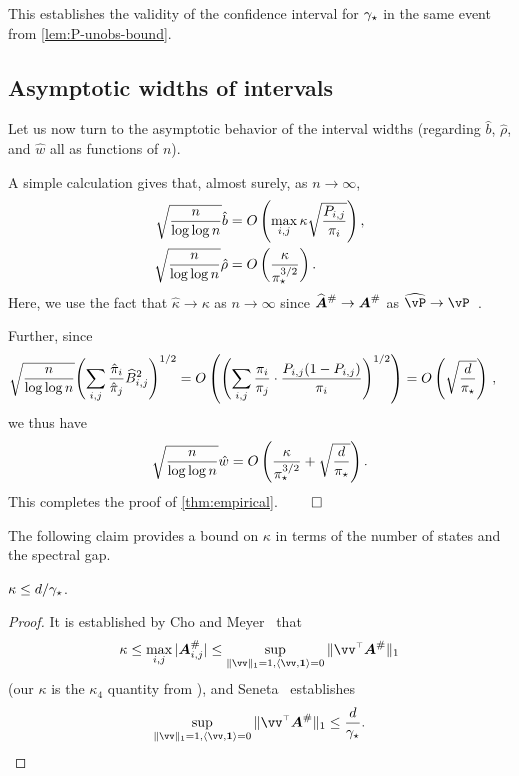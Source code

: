 This establishes the validity of the confidence interval for $\gamma_{\star}$ in
the same event from \cref{lem:P-unobs-bound}.

\subsection{Asymptotic widths of intervals}
\label{sec:asymptotic}

Let us now turn to the asymptotic behavior of the interval widths
(regarding $\hat{b}$, $\hat\rho$, and $\hat{w}$ all as
functions of $n$).

A simple calculation gives that, almost surely, as $n\to \infty$,
\begin{align*}
  \sqrt{\frac{n}{\log\log n}}
  \hat{b}
  & =
  O\left(
    \max_{i,j} \kappa \sqrt{\frac{P_{i,j}}{\pi_i}}
  \right)
  ,
  \\
  \sqrt{\frac{n}{\log\log n}}
  \hat\rho
  & =
  O\left(
    \frac{\kappa}{\pi_{\star}^{3/2}}
  \right)
  .
\end{align*}
Here, we use the fact that $\hat\kappa \to \kappa$ as $n\to\infty$
since $\giAh \to \giA$ as $\wh\vP \to
\vP$~\citep{li2001improvement,benitez2012continuity}.

Further, since
\begin{align*}
  \sqrt{\frac{n}{\log\log n}}
  \Biggl(
    \sum_{i,j} \frac{\hat{\pi}_i}{\hat{\pi}_j} \widehat{B}_{i,j}^2
  \Biggr)^{1/2}
  & =
  O\left(
    \Biggl(
      \sum_{i,j} \frac{{\pi}_i}{{\pi}_j}
      \cdot \frac{P_{i,j}(1-P_{i,j})}{\pi_i}
    \Biggr)^{1/2}
  \right)
  =
  O\left( \sqrt{ \frac{d}{\pi_{\star}}} \right)
  \,,
\end{align*}
we thus have
\begin{align*}
  \sqrt{\frac{n}{\log\log n}}
  \hat{w}
  =
  O\left(
    \frac{\kappa}{\pi_{\star}^{3/2}} +
    \sqrt{\frac{d}{\pi_{\star}}}
  \right)
  .
\end{align*}
This completes the proof of \cref{thm:empirical}.
\hfill $\qed$

The following claim provides a bound on $\kappa$ in terms of the
number of states and the spectral gap.
\begin{claim}
  \label{claim:kappa-bound}
  $\kappa \leq d/\gamma_{\star}$.
\end{claim}
\begin{proof}
  It is established by Cho and Meyer~\citep{cho2001comparison} that
  \[
    \kappa
    \leq \max_{i,j} |\giA_{i,j}|
    \leq
    \sup_{\norm{\vv}_1 = 1 , \dotp{\vv,\v1} = 0} \norm{\vv^\t \giA}_1
  \]
  (our $\kappa$ is the $\kappa_4$ quantity from
  \citep{cho2001comparison}), and Seneta~\citep{seneta1993sensitivity}
  establishes
  \[
    \sup_{\norm{\vv}_1 = 1 , \dotp{\vv,\v1} = 0} \norm{\vv^\t \giA}_1
    \leq
    \frac{d}{\gap}
    .
    \qedhere
  \]
\end{proof}
